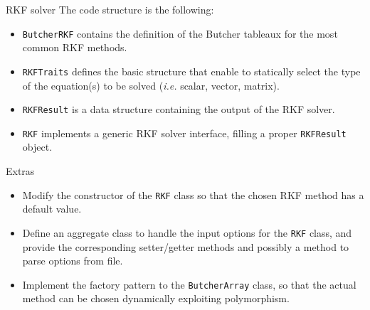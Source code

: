 \documentclass[10pt]{beamer}
\begin{document}
\begin{frame}{RKF solver}
The code structure is the following:
\begin{itemize}
  \item \texttt{ButcherRKF} contains the definition of the Butcher tableaux for the most common RKF methods.
  \item \texttt{RKFTraits} defines the basic structure that enable to statically select the type of the equation(s) to be solved (\textit{i.e.} scalar, vector, matrix).
  \item \texttt{RKFResult} is a data structure containing the output of the RKF solver.
  \item \texttt{RKF} implements a generic RKF solver interface, filling a proper \texttt{RKFResult} object.
\end{itemize}
\end{frame}

\begin{frame}{Extras}
\begin{itemize}
  \item Modify the constructor of the \texttt{RKF} class so that the chosen RKF method has a default value.
  \item Define an aggregate class to handle the input options for the \texttt{RKF} class, %
   and provide the corresponding setter/getter methods and possibly a method to parse options from file.
  \item Implement the factory pattern to the \texttt{ButcherArray} class, so that the actual method can be chosen dynamically exploiting polymorphism.
\end{itemize}
\end{frame}
\end{document}

